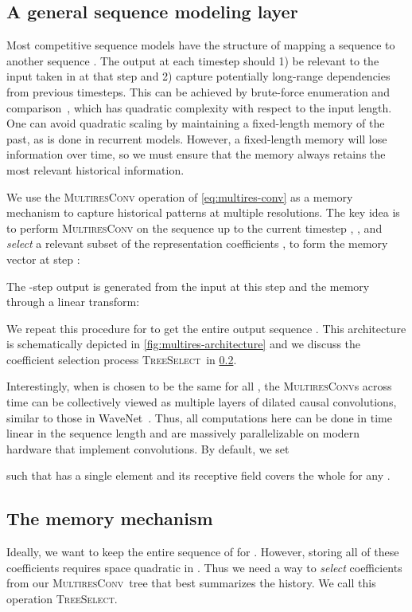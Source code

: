 \documentclass{article}
\theoremstyle{plain}
\theoremstyle{definition}
\theoremstyle{remark}
\newcommand{\treeselect}{\textsc{TreeSelect}}
\newcommand{\ourconv}{\textsc{MultiresConv}}
\begin{document}
\subsection{A general sequence modeling layer}

Most competitive sequence models have the structure of mapping a sequence  to another sequence . 
The output at each timestep should 1) be relevant to the input taken in at that step and 2) capture potentially long-range dependencies from previous timesteps. 
This can be achieved by brute-force enumeration and comparison~\citep{vaswani2017attention}, which has quadratic complexity with respect to the input length. 
One can avoid quadratic scaling by maintaining a fixed-length memory of the past, as is done in recurrent models.  
However, a fixed-length memory will lose information over time, so we must ensure that the memory always retains the most relevant historical information.

We use the \textsc{MultiresConv} operation of \cref{eq:multires-conv} as a memory mechanism to capture historical patterns at multiple resolutions. 
The key idea is to perform \textsc{MultiresConv} on the sequence up to the current timestep , , and \emph{select} a relevant subset of the representation coefficients ,  to form the memory vector  at step : 

The -step output  is generated from the input at this step and the memory through a linear transform: 
 
We repeat this procedure for  to get the entire output sequence . 
This architecture is schematically depicted in \cref{fig:multires-architecture} and
we discuss the coefficient selection process \treeselect\ in \cref{sec:memory}.

Interestingly, when  is chosen to be the same for all , the \ourconv s across time can be collectively viewed as multiple layers of dilated causal convolutions, similar to those in WaveNet~\citep{oord2016wavenet}. 
Thus, all computations here can be done in time linear in the sequence length and are massively parallelizable on modern hardware that implement convolutions. 
By default, we set

such that  has a single element  and its receptive field covers the whole  for any . 




\subsection{The memory mechanism}\label{sec:memory}
Ideally, we want to keep the entire sequence of  for .
However, 
storing all of these coefficients requires space quadratic in . Thus we need a way to \emph{select} coefficients from our \ourconv\ tree that best summarizes the history. 
We call this operation \treeselect.
\end{document}
